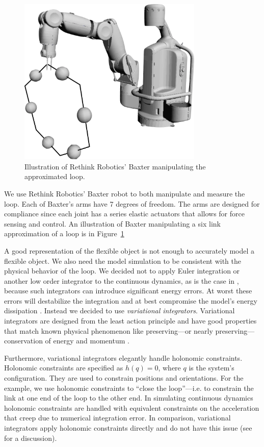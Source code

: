 \documentclass[letterpaper, 10pt, conference]{ieeeconf}
\begin{document}
\begin{figure}
\centering
\includegraphics[width = 250pt]{bloop_image_1.pdf}
\caption{Illustration of Rethink Robotics' Baxter manipulating the approximated loop.}
\label{fig-baxter_image_1}
\end{figure}

We use Rethink Robotics' Baxter robot to both manipulate and measure the loop.  Each of Baxter's arms have 7 degrees of freedom.  The arms are designed for compliance since each joint has a series elastic actuators that allows for force sensing and control.  An illustration of Baxter manipulating a six link approximation of a loop is in Figure~\ref{fig-baxter_image_1}

A good representation of the flexible object is not enough to accurately model a flexible object.  We also need the model simulation to be consistent with the physical behavior of the loop.  We decided not to apply Euler integration or another low order integrator to the continuous dynamics, as is the case in \cite{sahari_etal}, because such integrators can introduce significant energy errors.  At worst these errors will destabilize the integration and at best compromise the model's energy dissipation \cite{johnson_murphey_scalable}.  Instead we decided to use \emph{variational integrators}.  Variational integrators are designed from the least action principle and have good properties that match known physical phenomenon like preserving---or nearly preserving---conservation of energy and momentum \cite{johnson_murphey_scalable, marsden_west}.

Furthermore, variational integrators elegantly handle holonomic constraints.  Holonomic constraints are specified as $h(q) = 0$, where $q$ is the system's configuration.  They are used to constrain positions and orientations.  For the example, we use holonomic constraints to ``close the loop''---i.e. to constrain the link at one end of the loop to the other end.  In simulating continuous dynamics holonomic constraints are handled with equivalent constraints on the acceleration that creep due to numerical integration error.  In comparison, variational integrators apply holonomic constraints directly and do not have this issue (see \cite{johnson_murphey_scalable} for a discussion).
\end{document}
